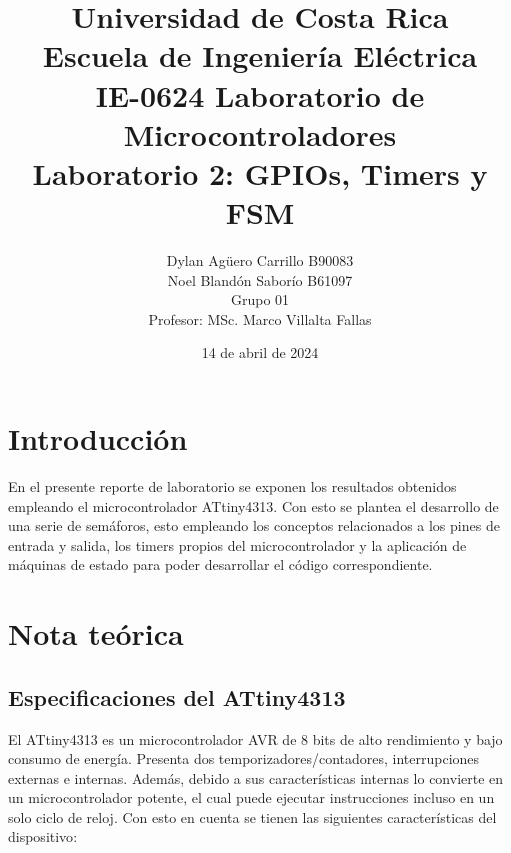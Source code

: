 \documentclass[12pt,letterpaper]{article}
\begin{document}
\author{Dylan Agüero Carrillo B90083 \\
        Noel Blandón Saborío  B61097 \\
        [10mm] {Grupo 01}\\ [10mm] Profesor: MSc. Marco Villalta Fallas\\ [20mm]}

\title{%
{\large{\sc Universidad de Costa Rica}} \\[-2mm] {\large Escuela de Ingeniería Eléctrica} \\[-2mm] {\large IE-0624 Laboratorio de Microcontroladores} \\[20mm]
Laboratorio 2: GPIOs, Timers y FSM\\ [20mm]
}

\date{14 de abril de 2024}

\maketitle							%
\thispagestyle{empty}

\newpage
{} 
\setlength{\parindent}{0.6cm}
\setlength{\parskip}{0.25cm}

\section{Introducción}
En el presente reporte de laboratorio se exponen los resultados obtenidos empleando el microcontrolador ATtiny4313. Con esto se plantea el desarrollo de una serie de semáforos, esto empleando los conceptos relacionados a los pines de entrada y salida, los timers propios del microcontrolador y la aplicación de máquinas de estado para poder desarrollar el código correspondiente.


\section{Nota teórica}
\subsection{Especificaciones del ATtiny4313}
El ATtiny4313 es un microcontrolador AVR de 8 bits de alto rendimiento y bajo consumo de energía. Presenta dos temporizadores/contadores, interrupciones externas e internas. Además, debido a sus características internas lo convierte en un microcontrolador potente, el cual puede ejecutar instrucciones incluso en un solo ciclo de reloj. Con esto en cuenta se tienen las siguientes características del dispositivo\cite{Microchip_Technology_2011}:
\end{document}
